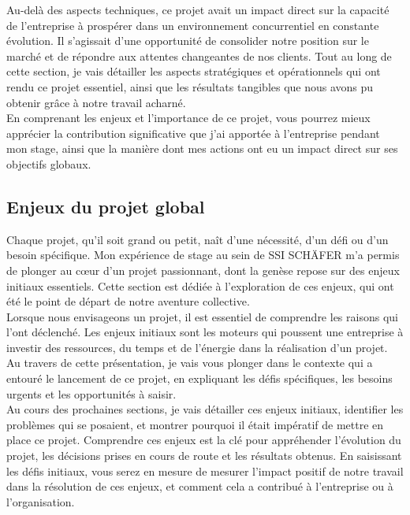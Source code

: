 \documentclass[a4paper, 12pt, french]{article}
\begin{document}
			Au-delà des aspects techniques, ce projet avait un impact direct sur la capacité de l'entreprise à prospérer dans un environnement concurrentiel en constante évolution. Il s'agissait d'une opportunité de consolider notre position sur le marché et de répondre aux attentes changeantes de nos clients. Tout au long de cette section, je vais détailler les aspects stratégiques et opérationnels qui ont rendu ce projet essentiel, ainsi que les résultats tangibles que nous avons pu obtenir grâce à notre travail acharné.\\

			En comprenant les enjeux et l'importance de ce projet, vous pourrez mieux apprécier la contribution significative que j'ai apportée à l'entreprise pendant mon stage, ainsi que la manière dont mes actions ont eu un impact direct sur ses objectifs globaux.
				
			\subsection{Enjeux du projet global}
				Chaque projet, qu'il soit grand ou petit, naît d'une nécessité, d'un défi ou d'un besoin spécifique. Mon expérience de stage au sein de SSI SCHÄFER m'a permis de plonger au cœur d'un projet passionnant, dont la genèse repose sur des enjeux initiaux essentiels. Cette section est dédiée à l'exploration de ces enjeux, qui ont été le point de départ de notre aventure collective.\\

				Lorsque nous envisageons un projet, il est essentiel de comprendre les raisons qui l'ont déclenché. Les enjeux initiaux sont les moteurs qui poussent une entreprise à investir des ressources, du temps et de l'énergie dans la réalisation d'un projet. Au travers de cette présentation, je vais vous plonger dans le contexte qui a entouré le lancement de ce projet, en expliquant les défis spécifiques, les besoins urgents et les opportunités à saisir.\\

				Au cours des prochaines sections, je vais détailler ces enjeux initiaux, identifier les problèmes qui se posaient, et montrer pourquoi il était impératif de mettre en place ce projet. Comprendre ces enjeux est la clé pour appréhender l'évolution du projet, les décisions prises en cours de route et les résultats obtenus. En saisissant les défis initiaux, vous serez en mesure de mesurer l'impact positif de notre travail dans la résolution de ces enjeux, et comment cela a contribué à l'entreprise ou à l'organisation.\\
\end{document}
